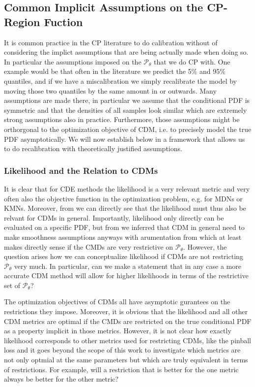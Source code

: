 \subsection{Common Implicit Assumptions on the CP-Region Fuction}\label{sec:implicit_assumptions_cp}

It is common practice in the CP literature to do calibration without of considering the implict assumptions that are being actually made when doing so. In particular the assumptions imposed on the $\mathscr{P}_\theta$ that we do CP with. One example would be that often in the literature we predict the 5\% and 95\% quantiles, and if we have a miscalibration we simply recalibrate the model by moving those two quantiles by the same amount in or outwards. Many assumptions are made there, in particular we assume that the conditional PDF is symmetric and that the densities of all samples look similar which are extremely strong assumptions also in practice. Furthermore, those assumptions might be orthorgonal to the optimization objective of CDM, i.e. to precisely model the true PDF asymptotically. We will now establish below in  a framework that allows us to do recalibration with theoretically justified assumptions.

\subsubsection{Likelihood and the Relation to CDMs}\label{sec:shape_importance}

It is clear that for CDE methods the likelihood is a very relevant metric and very often also the objective function in the optimization problem, e.g. for MDNs or KMNs. Moreover, from  we can directly see that the likelihood must thus also be relvant for CDMs in general. Importantly, likelihood only directly can be evaluated on a specific PDF, but from  we inferred that CDM in general need to make smoothness assumptions anyways with arumentation from  which at least makes directly sense if the CMDs are very restrictive on $\mathscr{P}_\theta$. However, the question arises how we can conceptualize likelihood if CDMs are not restricting $\mathscr{P}_\theta$ very much. In particular, can we make a statement that in any case a more accurate CDM method will allow for higher likelihoods in terms of the restrictive set of $\mathscr{P}_\theta$?

The optimization objectives of CDMs all have asymptotic gurantees on the restrictions they impose. Moreover, it is obvious that the likelihood and all other CDM metrics are optimal if the CMDs are restricted on the true conditional PDF as a property implicit in those metrics. However, it is not clear how exactly likelihood corresponds to other metrics used for restricting CDMs, like the pinball loss and it goes beyond the scope of this work to investigate which metrics are not only optmial at the same parameters but which are truly equivalent in terms of restrictions. For example, will a restriction that is better for the one metric always be better for the other metric? 

